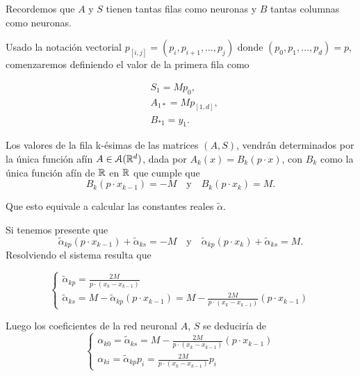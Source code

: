 \begin{aportacionOriginal}
Recordemos que $A$ y $S$ tienen tantas filas como neuronas  y $B$ tantas columnas como neuronas. 

Usado la notación vectorial
$p_{[i,j]} = (p_i, p_{i+1}, \ldots, p_{j})$ donde $(p_0, p_1, \ldots, p_d)=p$, comenzaremos definiendo el valor de la primera fila como

\begin{align}
    &S_1 = M p_0, \\
    & A_{1 *} = M p_{[1,d]}, \\
    & B_{* 1} = y_1.
\end{align}

Los valores de la fila  k-ésimas de las matrices $(A,S)$, vendrán determinados por la única función afín $A \in \mathcal{A}(\mathbb{R}^d)$, 
dada por $A_k(x)=B_k(p \cdot x)$, con $B_{k}$ como la única función afín de $\mathbb{R}$ en $\mathbb{R}$ que cumple que 
\begin{equation}
    B_k(p \cdot x_{k-1}) = -M 
    \quad \text{y} \quad 
     B_{k}(p \cdot x_k)= M.
\end{equation}

Que esto equivale a calcular las constantes reales $\tilde {\alpha}$. 

Si tenemos presente que 
\begin{equation}
    \tilde{\alpha}_{k p} (p \cdot x_{k-1}) + \tilde{\alpha}_{k s} = -M 
    \quad \text{y} \quad 
    \tilde{\alpha}_{k p}(p \cdot x_k) + \tilde{\alpha}_{k s}= M.
\end{equation} 
Resolviendo el sistema resulta que 

\begin{equation}
    \left\{ 
        \begin{array}{l}
            \tilde{\alpha}_{k p} = \frac{2 M}{p \cdot (x_k - x_{k-1})}
            \\
            \tilde{\alpha}_{k s} 
            = M -  \tilde{\alpha}_{k p}(p \cdot x_{k-1})
            = M -  \frac{2 M}{p \cdot (x_k - x_{k-1})}(p \cdot x_{k-1}) 
        \end{array}
    \right.
\end{equation}

Luego los coeficientes de la red neuronal $A$, $S$ se deduciría de 
\begin{equation}
    \left\{ 
        \begin{array}{l}
            \alpha_{k 0} = \tilde{\alpha}_{k s} =
            M -  \frac{2 M}{p \cdot (x_k - x_{k-1})}(p \cdot x_{k-1}) 
            \\
            \alpha_{k i} =  \tilde{\alpha}_{k p} p_{i}
            = 
            \frac{2 M}{p \cdot (x_k - x_{k-1})}
            p_i 
        \end{array}
        \right.
\end{equation}


\end{aportacionOriginal}
